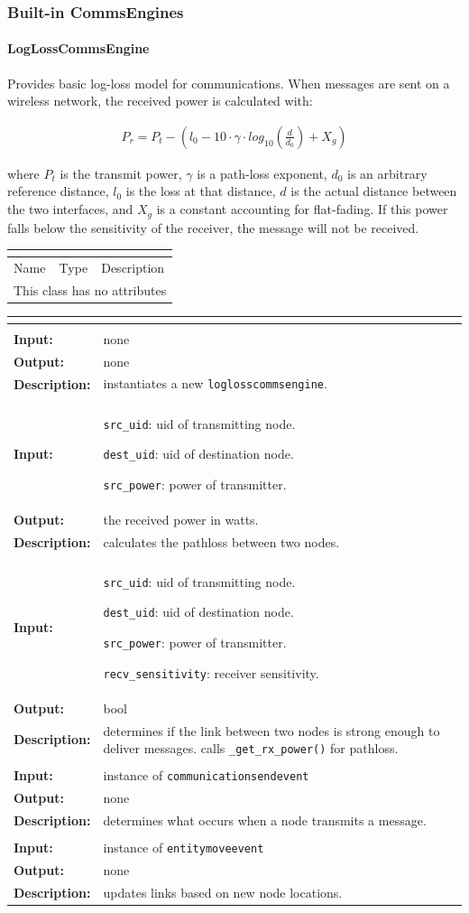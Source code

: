 \documentclass[titlepage]{article}
\renewenvironment{itemize*}
    {\begin{itemize}
        \setlength{\itemsep}{0pt}%
        \setlength{\parskip}{0pt}%
        \setlength{\partopsep}{0pt}%
        \setlength{\topsep}{0pt}}%
    {\end{itemize}}
\newcommand{\operations}[1]{
\begin{center}
    \begin{longtable}{|p{4cm}|p{10cm + 2.0\tabcolsep}|}
    \hline
    \multicolumn{2}{|l|}{\cellcolor[gray]{0.5}{\textbf{Operations}}} \\ \hline
#1
    \end{longtable}
\end{center}
}
\newcommand{\operation}[4]{
    \hline
    \multicolumn{2}{|l|}{\cellcolor[gray]{0.8}{\texttt{#1}}} \\ \hline
    \hspace{7pt}\textbf{Input:} & #2 \\ \hline
    \hspace{7pt}\textbf{Output:} & #3 \\ \hline
    \hspace{7pt}\textbf{Description:} & #4 \\ \hline
}
\newcommand{\noattributes}{
    \begin{center}
        \begin{tabular}{|p{3cm}|p{3cm}|p{8cm}|}
            \multicolumn{3}{|l|}{\cellcolor[gray]{0.5}{\textbf{Attributes}}} \\ \hline
            \rowcolor[gray]{0.8} Name & Type & Description \\ \hline 
            \multicolumn{3}{|c|}{This class has no attributes} \\ \hline
        \end{tabular}
    \end{center}
}
\begin{document}
\subsubsection{Built-in CommsEngines}
\paragraph{LogLossCommsEngine}{Provides basic log-loss model for communications.  When messages are sent on a wireless network, the received power is calculated with:

\begin{align*}
    P_r = P_t - \left(l_0 - 10 \cdot \gamma \cdot log_{10}\left(\frac{d}{d_0}\right) + X_g\right)
\end{align*}

where $P_t$ is the transmit power, $\gamma$ is a path-loss exponent, $d_0$ is an arbitrary reference distance, $l_0$ is the loss at that distance, $d$ is the actual distance between the two interfaces, and $X_g$ is a constant accounting for flat-fading.  If this power falls below the sensitivity of the receiver, the message will not be received.}

\noattributes

\operations
{
    \operation{\_\_init\_\_()}{none}{none}{instantiates a new \texttt{loglosscommsengine}.}
    \operation{\_get\_rx\_power(src\_uid, dest\_uid, src\_power}{
        \begin{itemize*}
            \item \texttt{src\_uid}: uid of transmitting node.
            \item \texttt{dest\_uid}: uid of destination node.
            \item \texttt{src\_power}: power of transmitter.
        \end{itemize*}}{the received power in watts.}{calculates the pathloss between two nodes.}
    \operation{\_should\_deliver(src\_uid, dest\_uid, src\_power, recv\_sensitivity)}{
        \begin{itemize*}
            \item \texttt{src\_uid}: uid of transmitting node.
            \item \texttt{dest\_uid}: uid of destination node.
            \item \texttt{src\_power}: power of transmitter.
            \item \texttt{recv\_sensitivity}: receiver sensitivity.
        \end{itemize*}}{bool}{determines if the link between two nodes is strong enough to deliver messages.  calls \texttt{\_get\_rx\_power()} for pathloss.}
    \operation{\_on\_send(event)}{instance of \texttt{communicationsendevent}}{none}{determines what occurs when a node transmits a message.}
    \operation{\_on\_movement(event)}{instance of \texttt{entitymoveevent}}{none}{updates links based on new node locations.}
}
\end{document}
